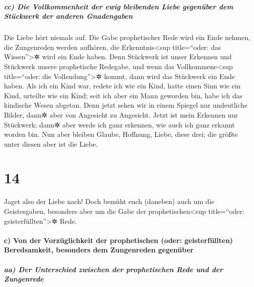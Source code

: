 \hypertarget{cc-die-vollkommenheit-der-ewig-bleibenden-liebe-gegenuxfcber-dem-stuxfcckwerk-der-anderen-gnadengaben}{%
\subparagraph{cc) Die Vollkommenheit der ewig bleibenden Liebe gegenüber
dem Stückwerk der anderen
Gnadengaben}\label{cc-die-vollkommenheit-der-ewig-bleibenden-liebe-gegenuxfcber-dem-stuxfcckwerk-der-anderen-gnadengaben}}

 Die Liebe hört niemals auf. Die Gabe prophetischer Rede
wird ein Ende nehmen, die Zungenreden werden aufhören, die
Erkenntnis\textless sup title=``oder: das Wissen''\textgreater✲ wird ein
Ende haben.  Denn Stückwerk ist unser Erkennen und
Stückwerk unsere prophetische Redegabe,  und wenn das
Vollkommene\textless sup title=``oder: die Vollendung''\textgreater✲
kommt, dann wird das Stückwerk ein Ende haben.  Als ich
ein Kind war, redete ich wie ein Kind, hatte einen Sinn wie ein Kind,
urteilte wie ein Kind; seit ich aber ein Mann geworden bin, habe ich das
kindische Wesen abgetan.  Denn jetzt sehen wir in einem
Spiegel nur undeutliche Bilder, dann✲ aber von Angesicht zu Angesicht.
Jetzt ist mein Erkennen nur Stückwerk; dann✲ aber werde ich ganz
erkennen, wie auch ich ganz erkannt worden bin.  Nun aber
bleiben Glaube, Hoffnung, Liebe, diese drei; die größte unter diesen
aber ist die Liebe.

\hypertarget{section-13}{%
\section{14}\label{section-13}}

 Jaget also der Liebe nach! Doch bemüht euch (daneben)
auch um die Geistesgaben, besonders aber um die Gabe der
prophetischen\textless sup title=``oder: geisterfüllten''\textgreater✲
Rede.

\hypertarget{c-von-der-vorzuxfcglichkeit-der-prophetischen-oder-geisterfuxfcllten-beredsamkeit-besonders-dem-zungenreden-gegenuxfcber}{%
\paragraph{c) Von der Vorzüglichkeit der prophetischen (oder:
geisterfüllten) Beredsamkeit, besonders dem Zungenreden
gegenüber}\label{c-von-der-vorzuxfcglichkeit-der-prophetischen-oder-geisterfuxfcllten-beredsamkeit-besonders-dem-zungenreden-gegenuxfcber}}

\hypertarget{aa-der-unterschied-zwischen-der-prophetischen-rede-und-der-zungenrede}{%
\subparagraph{aa) Der Unterschied zwischen der prophetischen Rede und
der
Zungenrede}\label{aa-der-unterschied-zwischen-der-prophetischen-rede-und-der-zungenrede}}

